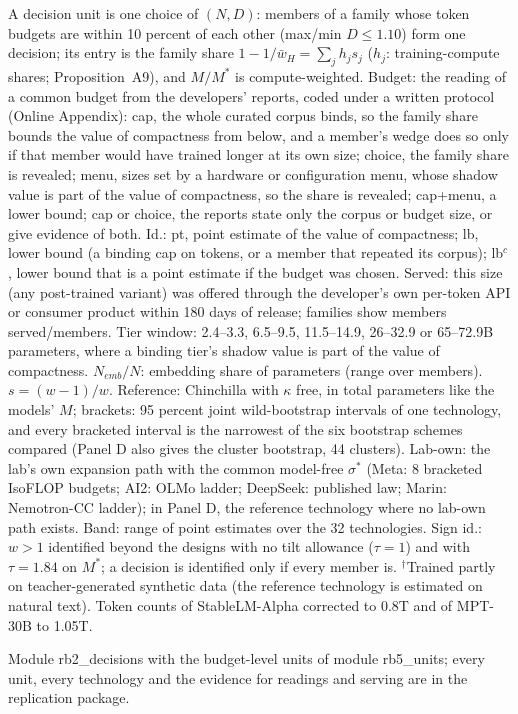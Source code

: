 \begin{table}[tp]
\medskip
\begin{tablenotes}
A decision unit is one choice of $(N,D)$: members of a family whose token budgets are within 10 percent of each other (max/min $D\le1.10$) form one decision; its entry is the family share $1-1/\bar w_H=\sum_jh_js_j$ ($h_j$: training-compute shares; Proposition~A9), and $M/M^*$ is compute-weighted. Budget: the reading of a common budget from the developers' reports, coded under a written protocol (Online Appendix): cap, the whole curated corpus binds, so the family share bounds the value of compactness from below, and a member's wedge does so only if that member would have trained longer at its own size; choice, the family share is revealed; menu, sizes set by a hardware or configuration menu, whose shadow value is part of the value of compactness, so the share is revealed; cap+menu, a lower bound; cap or choice, the reports state only the corpus or budget size, or give evidence of both. Id.: pt, point estimate of the value of compactness; lb, lower bound (a binding cap on tokens, or a member that repeated its corpus); lb$^c$, lower bound that is a point estimate if the budget was chosen. Served: this size (any post-trained variant) was offered through the developer's own per-token API or consumer product within 180 days of release; families show members served/members. Tier window: 2.4--3.3, 6.5--9.5, 11.5--14.9, 26--32.9 or 65--72.9B parameters, where a binding tier's shadow value is part of the value of compactness. $N_{emb}/N$: embedding share of parameters (range over members). $s=(w-1)/w$. Reference: Chinchilla with $\kappa$ free, in total parameters like the models' $M$; brackets: 95 percent joint wild-bootstrap intervals of one technology, and every bracketed interval is the narrowest of the six bootstrap schemes compared (Panel D also gives the cluster bootstrap, 44 clusters). Lab-own: the lab's own expansion path with the common model-free $\sigma^*$ (Meta: 8 bracketed IsoFLOP budgets; AI2: OLMo ladder; DeepSeek: published law; Marin: Nemotron-CC ladder); in Panel D, the reference technology where no lab-own path exists. Band: range of point estimates over the 32 technologies. Sign id.: $w>1$ identified beyond the designs with no tilt allowance ($\tau=1$) and with $\tau=1.84$ on $M^*$; a decision is identified only if every member is. $^\dagger$Trained partly on teacher-generated synthetic data (the reference technology is estimated on natural text). Token counts of StableLM-Alpha corrected to 0.8T and of MPT-30B to 1.05T.
\end{tablenotes}
\begin{tablenotes}[Source]
Module rb2\_decisions with the budget-level units of module rb5\_units; every unit, every technology and the evidence for readings and serving are in the replication package.
\end{tablenotes}
\end{table}
